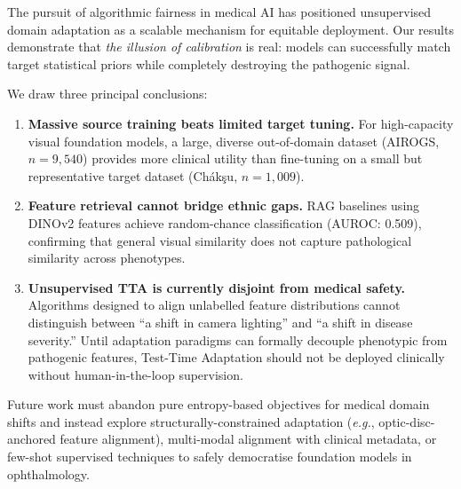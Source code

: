 \documentclass[11pt,twocolumn]{article}
\newcommand{\eg}{\emph{e.g.}}
\begin{document}
The pursuit of algorithmic fairness in medical AI has positioned unsupervised domain adaptation as a scalable mechanism for equitable deployment. Our results demonstrate that \emph{the illusion of calibration} is real: models can successfully match target statistical priors while completely destroying the pathogenic signal.

We draw three principal conclusions:

\begin{enumerate}[leftmargin=*,itemsep=2pt]
    \item \textbf{Massive source training beats limited target tuning.} For high-capacity visual foundation models, a large, diverse out-of-domain dataset (AIROGS, $n{=}9{,}540$) provides more clinical utility than fine-tuning on a small but representative target dataset (Ch\'{a}k\c{s}u, $n{=}1{,}009$).
    \item \textbf{Feature retrieval cannot bridge ethnic gaps.} RAG baselines using DINOv2 features achieve random-chance classification (AUROC: 0.509), confirming that general visual similarity does not capture pathological similarity across phenotypes.
    \item \textbf{Unsupervised TTA is currently disjoint from medical safety.} Algorithms designed to align unlabelled feature distributions cannot distinguish between ``a shift in camera lighting'' and ``a shift in disease severity.'' Until adaptation paradigms can formally decouple phenotypic from pathogenic features, Test-Time Adaptation should not be deployed clinically without human-in-the-loop supervision.
\end{enumerate}

Future work must abandon pure entropy-based objectives for medical domain shifts and instead explore structurally-constrained adaptation (\eg, optic-disc-anchored feature alignment), multi-modal alignment with clinical metadata, or few-shot supervised techniques to safely democratise foundation models in ophthalmology.



\end{document}
